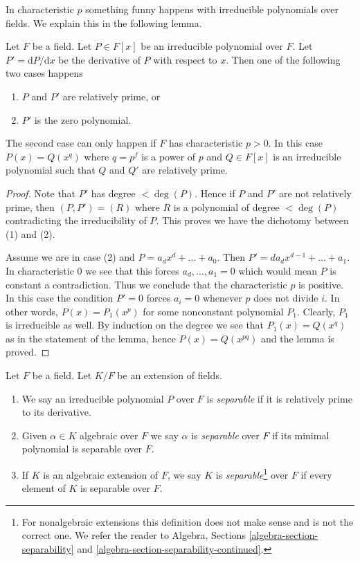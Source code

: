 \noindent
In characteristic $p$ something funny happens with irreducible polynomials
over fields. We explain this in the following lemma.

\begin{lemma}
\label{lemma-irreducible-polynomials}
Let $F$ be a field. Let $P \in F[x]$ be an irreducible polynomial over $F$.
Let $P' = \text{d}P/\text{d}x$ be the derivative of $P$ with respect
to $x$. Then one of the following two cases happens
\begin{enumerate}
\item $P$ and $P'$ are relatively prime, or
\item $P'$ is the zero polynomial.
\end{enumerate}
The second case can only happen if $F$ has characteristic $p > 0$.
In this case $P(x) = Q(x^q)$ where $q = p^f$ is a power of $p$ and
$Q \in F[x]$ is an irreducible polynomial such that $Q$ and $Q'$
are relatively prime.
\end{lemma}

\begin{proof}
Note that $P'$ has degree $< \deg(P)$. Hence if $P$ and $P'$ are not relatively
prime, then $(P, P') = (R)$ where $R$ is a polynomial of degree $< \deg(P)$
contradicting the irreducibility of $P$. This proves we have the dichotomy
between (1) and (2).

\medskip\noindent
Assume we are in case (2) and $P = a_d x^d + \ldots + a_0$. Then
$P' = da_d x^{d - 1} + \ldots + a_1$. In characteristic $0$ we see
that this forces $a_d, \ldots, a_1 = 0$ which would mean $P$ is constant
a contradiction. Thus we conclude that the characteristic $p$ is positive.
In this case the condition $P' = 0$ forces $a_i = 0$ whenever $p$ does
not divide $i$.
In other words, $P(x) = P_1(x^p)$ for some nonconstant polynomial $P_1$.
Clearly, $P_1$ is irreducible as well. By induction on the degree we
see that $P_1(x) = Q(x^q)$ as in the statement of the lemma, hence
$P(x) = Q(x^{pq})$ and the lemma is proved.
\end{proof}

\begin{definition}
\label{definition-separable}
Let $F$ be a field. Let $K/F$ be an extension of fields.
\begin{enumerate}
\item We say an irreducible polynomial $P$ over $F$ is {\it separable}
if it is relatively prime to its derivative.
\item Given $\alpha \in K$ algebraic over $F$ we say $\alpha$ is
{\it separable} over $F$ if its minimal polynomial is separable over $F$.
\item If $K$ is an algebraic extension of $F$, we say $K$ is
{\it separable}\footnote{For nonalgebraic extensions
this definition does not make sense and is not the correct one. We refer
the reader to Algebra, Sections \ref{algebra-section-separability} and
\ref{algebra-section-separability-continued}.}
over $F$ if every element of $K$ is separable over $F$.
\end{enumerate}
\end{definition}

